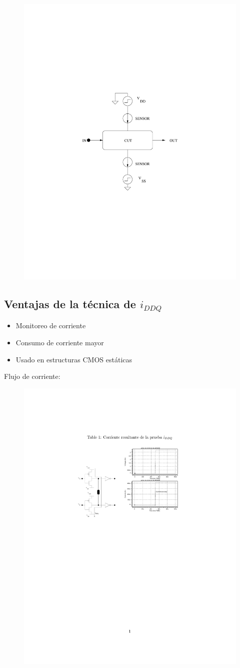 \documentclass[
paper=128mm:96mm, %
fontsize=11pt, %
pagesize, %
parskip=half-, %
]{scrartcl} %
\theoremstyle{mythmstyle} %
\begin{document}
  \begin{figure}[h]
    \centering\includegraphics[width=0.5\linewidth]{cut}
  \end{figure}

\clearpage


\subsection{Ventajas de la técnica de $i_{DDQ}$}

\begin{itemize}
\item Monitoreo de corriente
\item Consumo de corriente mayor
\item Usado en estructuras CMOS estáticas
\end{itemize}
\newpage
Flujo de corriente:
\begin{figure}[h]
\centering\includegraphics[width=0.6\linewidth]{iddq}
\end{figure}
\end{document}
